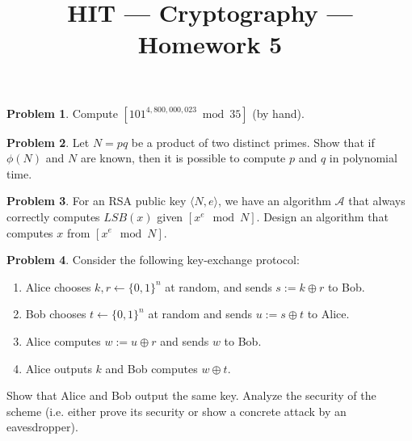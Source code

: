 \documentclass[11pt]{article}
\title{HIT --- Cryptography --- Homework 5}
\theoremstyle{definition}
\newtheorem{problem}{Problem}
\begin{document}
\maketitle


\begin{problem}
Compute $[101^{4,800,000,023} \bmod 35]$ (by hand).
\end{problem}

\begin{problem}
Let $N=pq$ be a product of two distinct primes. Show that if $\phi(N)$ and $N$ are known, then it is possible to compute $p$ and $q$ in polynomial time.
\end{problem}

\begin{problem}
For an RSA public key  $\langle N, e \rangle$, we have an algorithm $\mathcal{A}$ that always correctly computes $LSB(x)$ given $[ x^e \mod N]$. Design an algorithm that computes $x$ from $[ x^e \mod N]$.
\end{problem}

\begin{problem}
Consider the following key-exchange protocol:
\begin{enumerate}
\item Alice chooses $k,r \gets \{0,1\}^n$ at random, and sends $s:=k\oplus r$ to Bob.
\item Bob chooses $t \gets \{0,1\}^n$ at random and sends $u := s\oplus t$ to Alice.
\item Alice computes $w := u\oplus r$ and sends $w$ to Bob.
\item Alice outputs $k$ and Bob computes $w \oplus t$.
\end{enumerate}
Show that Alice and Bob output the same key. Analyze the security of the scheme (i.e. either prove its security or show a concrete attack by an eavesdropper).
\end{problem}
\end{document}
